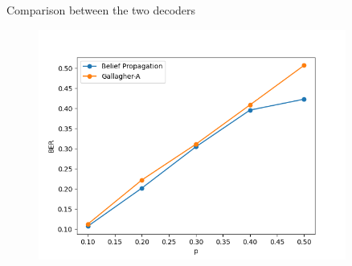 \begin{frame}
\begin{exampleblock}{Comparison between the two decoders}
    \begin{figure}
		\includegraphics[width=0.9\textwidth]{BSC/BSC.png}
	\end{figure}
\end{exampleblock}

\end{frame}